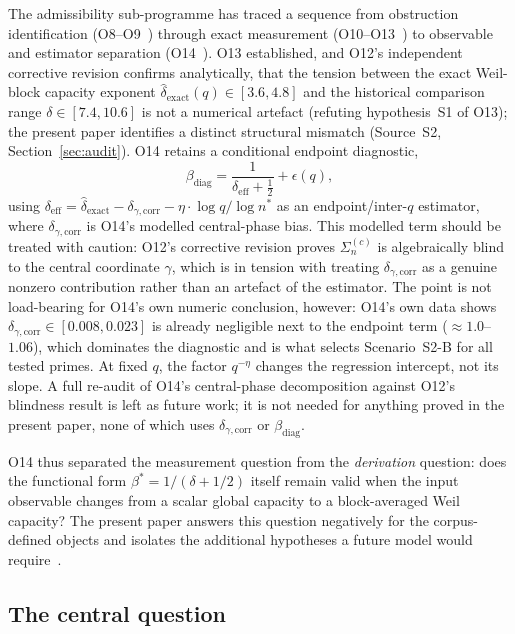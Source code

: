 \documentclass[11pt,a4paper]{article}
\newcommand{\dexact}{\hat{\delta}_{\mathrm{exact}}}
\newcommand{\deff}{\delta_{\mathrm{eff}}}
\newcommand{\bstar}{\beta^{*}}
\begin{document}
The admissibility sub-programme has traced a sequence from obstruction
identification (O8--O9~\cite{Beau2026a12,Beau2026a13}) through exact
measurement (O10--O13~\cite{Beau2026a14,Beau2026a15,Beau2026a16,Beau2026a17})
to observable and estimator separation (O14~\cite{Beau2026a18}).
O13 established, and O12's independent corrective revision confirms
analytically, that the tension between the exact Weil-block capacity
exponent $\dexact(q) \in [3.6, 4.8]$ and the historical comparison range
$\delta \in [7.4, 10.6]$ is not a numerical artefact (refuting hypothesis~S1
of O13); the present paper identifies a distinct structural mismatch
(Source~S2, Section~\ref{sec:audit}).
O14 retains a conditional endpoint diagnostic,
\begin{equation}
\label{eq:O14corrected}
\beta_{\mathrm{diag}} = \frac{1}{\deff + \tfrac{1}{2}} + \epsilon(q),
\end{equation}
using $\deff = \dexact - \delta_{\gamma,\mathrm{corr}}
- \eta \cdot \log q / \log n^{*}$ as an endpoint/inter-$q$ estimator, where
$\delta_{\gamma,\mathrm{corr}}$ is O14's modelled central-phase bias.
This modelled term should be treated with caution: O12's corrective revision
proves $\Sigma_n^{(c)}$ is algebraically blind to the central coordinate
$\gamma$, which is in tension with treating $\delta_{\gamma,\mathrm{corr}}$
as a genuine nonzero contribution rather than an artefact of the estimator.
The point is not load-bearing for O14's own numeric conclusion, however:
O14's own data shows $\delta_{\gamma,\mathrm{corr}}\in[0.008,0.023]$ is
already negligible next to the endpoint term ($\approx 1.0$--$1.06$), which
dominates the diagnostic and is what selects Scenario~S2-B for all tested
primes.
At fixed $q$, the factor $q^{-\eta}$ changes the regression intercept, not
its slope.
A full re-audit of O14's central-phase decomposition against O12's blindness
result is left as future work; it is not needed for anything proved in the
present paper, none of which uses $\delta_{\gamma,\mathrm{corr}}$ or
$\beta_{\mathrm{diag}}$.

O14 thus separated the measurement question from the
\emph{derivation} question:
does the functional form $\bstar = 1/(\delta + 1/2)$ itself remain valid
when the input observable changes from a scalar global capacity to a
block-averaged Weil capacity?
The present paper answers this question negatively for the corpus-defined objects and isolates
the additional hypotheses a future model would require~\cite{Beau2026sgn}.

\subsection{The central question}
\label{sec:central}
\end{document}
